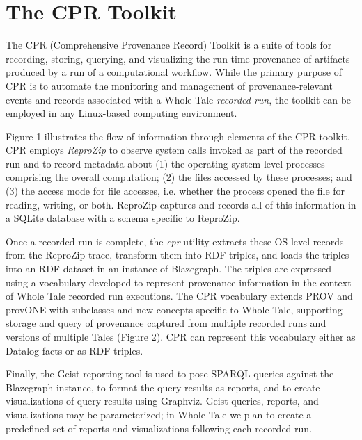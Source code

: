\section{The CPR Toolkit}

The CPR (Comprehensive Provenance Record) Toolkit is a suite of tools for recording, storing, querying, and visualizing the run-time provenance of artifacts produced by a run of a computational workflow. While the primary purpose of CPR  is to automate the monitoring and management of provenance-relevant events and records associated with a Whole Tale \emph{recorded run}, the toolkit can be employed in any Linux-based computing environment.

Figure 1 illustrates the flow of information through elements of the CPR toolkit. CPR employs \emph{ReproZip} to observe system calls invoked as part of the recorded run and to record metadata about (1) the operating-system level processes comprising the overall computation; (2) the files accessed by these processes; and (3) the access mode for file accesses, i.e. whether the process opened the file for reading, writing, or both. ReproZip captures and records all of this information in a SQLite database with a schema specific to ReproZip.

Once a recorded run is complete, the \emph{cpr} utility extracts these OS-level records from the ReproZip trace, transform them into RDF triples, and loads the triples into an RDF dataset in an instance of Blazegraph. The triples are expressed using a vocabulary developed to represent provenance information in the context of Whole Tale recorded run executions. The CPR vocabulary extends PROV and provONE with subclasses and new concepts specific to Whole Tale, supporting storage and query of provenance captured from multiple recorded runs and versions of multiple Tales (Figure 2). CPR can represent this vocabulary either as Datalog facts or as RDF triples.

Finally, the Geist reporting tool is used to pose SPARQL queries against the Blazegraph instance, to format the query results as reports, and to create visualizations of query results using Graphviz.  Geist queries, reports, and visualizations may be parameterized; in Whole Tale we plan to create a predefined set of reports and visualizations following each recorded run.

